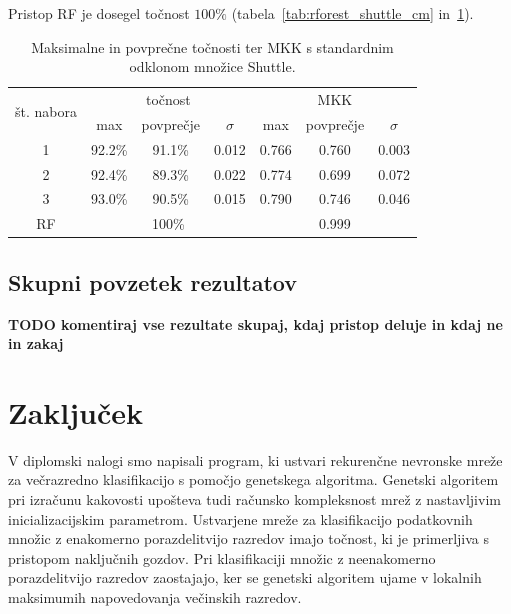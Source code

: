 \documentclass[a4paper,12pt,openright]{book}
\begin{document}
    Pristop RF je dosegel točnost $100\%$ (tabela~\ref{tab:rforest_shuttle_cm} in~\ref{tab:shuttle_result_aggregate}).

    \begin{table}[H]
        \begin{center}
            \begin{tabular}{|| c | c c c || c c c ||}
                \hline
                \multirow{2}{*}{št. nabora} & \multicolumn{3}{c||}{točnost} & \multicolumn{3}{c||}{MKK} \\ \cline{2-7}
                & max    & povprečje & $\sigma$ & max   & povprečje & $\sigma$ \\
                \hline
                1 & 92.2\% & 91.1\%    & 0.012    & 0.766 & 0.760     & 0.003    \\
                2 & 92.4\% & 89.3\%    & 0.022    & 0.774 & 0.699     & 0.072    \\
                3 & 93.0\% & 90.5\%    & 0.015    & 0.790 & 0.746     & 0.046    \\ \hline
                RF & \multicolumn{3}{c||}{100\%} & \multicolumn{3}{c||}{0.999} \\
                \hline
            \end{tabular}
        \end{center}
        \caption{Maksimalne in povprečne točnosti ter MKK s standardnim odklonom množice Shuttle.}
        \label{tab:shuttle_result_aggregate}
    \end{table}

    \section{Skupni povzetek rezultatov}\label{sec:skupni-povzetek-rezultatov}
    \textbf{TODO komentiraj vse rezultate skupaj, kdaj pristop deluje in kdaj ne in zakaj}


    \chapter{Zaključek}\label{ch:zakljucki-sklep}
    V diplomski nalogi smo napisali program, ki ustvari rekurenčne nevronske mreže za večrazredno klasifikacijo s pomočjo genetskega algoritma.
    Genetski algoritem pri izračunu kakovosti upošteva tudi računsko kompleksnost mrež z nastavljivim inicializacijskim parametrom.
    Ustvarjene mreže za klasifikacijo podatkovnih množic z enakomerno porazdelitvijo razredov imajo točnost, ki je primerljiva s
    pristopom naključnih gozdov.
    Pri klasifikaciji množic z neenakomerno porazdelitvijo razredov zaostajajo, ker se genetski
    algoritem ujame v lokalnih maksimumih napovedovanja večinskih razredov.
\end{document}
